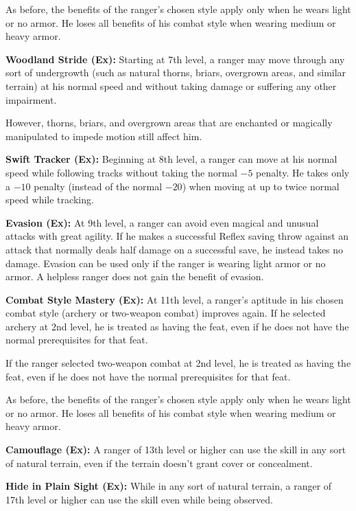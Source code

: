 As before, the benefits of the ranger's chosen style apply only when he wears light or no armor. He loses all benefits of his combat style when wearing medium or heavy armor.

\textbf{Woodland Stride (Ex):} Starting at 7th level, a ranger may move through any sort of undergrowth (such as natural thorns, briars, overgrown areas, and similar terrain) at his normal speed and without taking damage or suffering any other impairment.

However, thorns, briars, and overgrown areas that are enchanted or magically manipulated to impede motion still affect him.

\textbf{Swift Tracker (Ex):} Beginning at 8th level, a ranger can move at his normal speed while following tracks without taking the normal $-5$ penalty. He takes only a $-10$ penalty (instead of the normal $-20$) when moving at up to twice normal speed while tracking.

\textbf{Evasion (Ex):} At 9th level, a ranger can avoid even magical and unusual attacks with great agility. If he makes a successful Reflex saving throw against an attack that normally deals half damage on a successful save, he instead takes no damage. Evasion can be used only if the ranger is wearing light armor or no armor. A helpless ranger does not gain the benefit of evasion.

\textbf{Combat Style Mastery (Ex):} At 11th level, a ranger's aptitude in his chosen combat style (archery or two-weapon combat) improves again. If he selected archery at 2nd level, he is treated as having the  feat, even if he does not have the normal prerequisites for that feat.

If the ranger selected two-weapon combat at 2nd level, he is treated as having the  feat, even if he does not have the normal prerequisites for that feat.

As before, the benefits of the ranger's chosen style apply only when he wears light or no armor. He loses all benefits of his combat style when wearing medium or heavy armor.

\textbf{Camouflage (Ex):} A ranger of 13th level or higher can use the  skill in any sort of natural terrain, even if the terrain doesn't grant cover or concealment.

\textbf{Hide in Plain Sight (Ex):} While in any sort of natural terrain, a ranger of 17th level or higher can use the  skill even while being observed.


